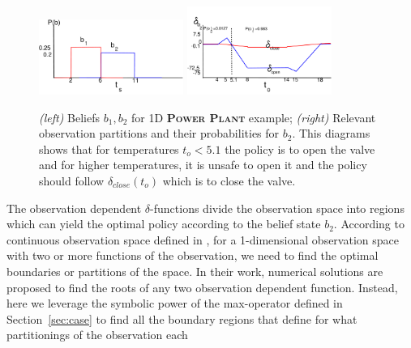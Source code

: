 \documentclass{article} %
\begin{document}
\begin{figure}[tbp!]
\vspace{-3mm}
\centering
\hspace{-20mm}
\includegraphics[width=0.42\textwidth]{pics/beliefs_2.pdf}
\hspace{10mm}
\includegraphics[width=0.42\textwidth]{pics/delta_b2_2.pdf}
\hspace{-17mm}
\vspace{-2mm}
\caption{\footnotesize 
{\it (left)} Beliefs $b_1,b_2$ for 1D \textsc{\bf Power Plant} example; 
{\it (right)} Relevant observation partitions and their probabilities for $b_2$. This diagrams shows that for temperatures $t_o < 5.1$ the policy is to open the valve and for higher temperatures, it is unsafe to open it and the policy should follow $\delta_{close}(t_o)$ which is to close the valve. 
}
\label{fig:beliefs}
\end{figure}
The observation dependent $\delta$-functions divide the observation space into regions which can yield the optimal policy according to the belief state $b_2$. According to continuous observation space defined in \cite{pascal_ijcai05}, for a 1-dimensional observation space with two or more functions of the observation, we need to find the optimal boundaries or partitions of the space. In their work, numerical solutions are proposed to find the roots of any two observation dependent function. Instead, here we leverage the symbolic power of the max-operator defined in Section~\ref{sec:case} to find all the boundary regions that define for what partitionings of the observation each 
\end{document}
